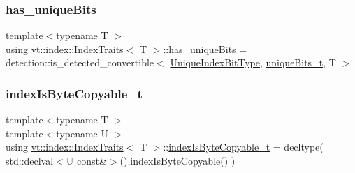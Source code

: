 \mbox{\label{structvt_1_1index_1_1_index_traits_a6862d0422947a4835262b170637b462d}} 
\subsubsection{\texorpdfstring{has\+\_\+unique\+Bits}{has\_uniqueBits}}
{\footnotesize\ttfamily template$<$typename T $>$ \\
using \hyperlink{structvt_1_1index_1_1_index_traits}{vt\+::index\+::\+Index\+Traits}$<$ T $>$\+::\hyperlink{structvt_1_1index_1_1_index_traits_a6862d0422947a4835262b170637b462d}{has\+\_\+unique\+Bits} =  detection\+::is\+\_\+detected\+\_\+convertible$<$ \hyperlink{namespacevt_a913e1f07b5228dd8bb64040dc6dcea14}{Unique\+Index\+Bit\+Type}, \hyperlink{structvt_1_1index_1_1_index_traits_ac56a2e3919488b64e42a60e1684623aa}{unique\+Bits\+\_\+t}, T $>$}

\mbox{\label{structvt_1_1index_1_1_index_traits_a67b716eec3bb224751d83b4f1e4d61fc}} 
\subsubsection{\texorpdfstring{index\+Is\+Byte\+Copyable\+\_\+t}{indexIsByteCopyable\_t}}
{\footnotesize\ttfamily template$<$typename T $>$ \\
template$<$typename U $>$ \\
using \hyperlink{structvt_1_1index_1_1_index_traits}{vt\+::index\+::\+Index\+Traits}$<$ T $>$\+::\hyperlink{structvt_1_1index_1_1_index_traits_a67b716eec3bb224751d83b4f1e4d61fc}{index\+Is\+Byte\+Copyable\+\_\+t} =  decltype( std\+::declval$<$U const\&$>$().index\+Is\+Byte\+Copyable() )}

\mbox{\label{structvt_1_1index_1_1_index_traits_a583a777d70fc52ccfe1083acabc9640f}} 
